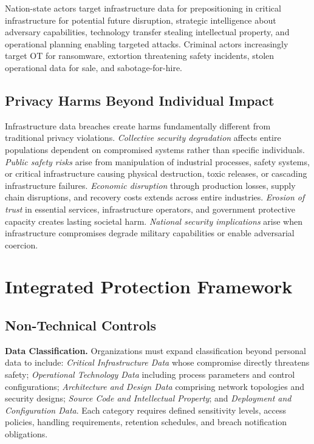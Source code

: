 \documentclass[sigconf,nonacm]{acmart}
\begin{document}
Nation-state actors target infrastructure data for pre\-positioning in critical
infrastructure for potential future disruption, strategic intelligence about adversary
capabilities, technology transfer stealing intellectual property, and operational
planning enabling targeted attacks. Criminal actors increasingly target OT for
ransomware, extortion threatening safety incidents, stolen operational data for sale,
and sabotage-for-hire.

\subsection{Privacy Harms Beyond Individual Impact}

Infrastructure data breaches create harms fundamentally different from traditional
privacy violations. \emph{Collective security degradation} affects entire populations
dependent on compromised systems rather than specific individuals. \emph{Public safety
risks} arise from manipulation of industrial processes, safety systems, or critical
infrastructure causing physical destruction, toxic releases, or cascading infrastructure
failures. \emph{Economic disruption} through production losses, supply chain disruptions,
and recovery costs extends across entire industries. \emph{Erosion of trust} in essential
services, infrastructure operators, and government protective capacity creates lasting
societal harm. \emph{National security implications} arise when infrastructure
compromises degrade military capabilities or enable adversarial coercion.

\section{Integrated Protection Framework}

\subsection{Non-Technical Controls}

\textbf{Data Classification.} Organizations must expand classification beyond personal
data to include: \emph{Critical Infrastructure Data} whose compromise directly threatens
safety; \emph{Operational Technology Data} including process parameters and control
configurations; \emph{Architecture and Design Data} comprising network topologies and
security designs; \emph{Source Code and Intellectual Property}; and \emph{Deployment and
Configuration Data}. Each category requires defined sensitivity levels, access policies,
handling requirements, retention schedules, and breach notification obligations.
\end{document}
